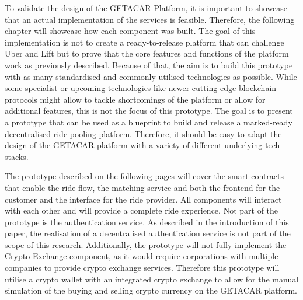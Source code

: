 To validate the design of the GETACAR Platform, it is important to showcase that an actual implementation of the services is feasible. Therefore, the following chapter will showcase how each component was built. The goal of this implementation is not to create a ready-to-release platform that can challenge Uber and Lift but to prove that the core features and functions of the platform work as previously described. Because of that, the aim is to build this prototype with as many standardised and commonly utilised technologies as possible. While some specialist or upcoming technologies like newer cutting-edge blockchain protocols might allow to tackle shortcomings of the platform or allow for additional features, this is not the focus of this prototype. The goal is to present a prototype that can be used as a blueprint to build and release a marked-ready decentralised ride-pooling platform. Therefore, it should be easy to adapt the design of the GETACAR platform with a variety of different underlying tech stacks.

The prototype described on the following pages will cover the smart contracts that enable the ride flow, the matching service and both the frontend for the customer and the interface for the ride provider. All components will interact with each other and will provide a complete ride experience. Not part of the prototype is the authentication service. As described in the introduction of this paper, the realisation of a decentralised authentication service is not part of the scope of this research. Additionally, the prototype will not fully implement the Crypto Exchange component, as it would require corporations with multiple companies to provide crypto exchange services. Therefore this prototype will utilise a crypto wallet with an integrated crypto exchange to allow for the manual simulation of the buying and selling crypto currency on the GETACAR platform.
